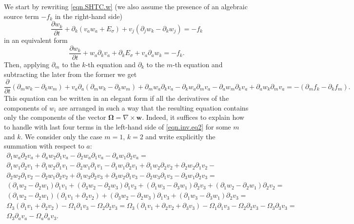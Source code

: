 \documentclass[twoside]{article}
\newcommand{\ww}{{\boldsymbol{w}}}
\newcommand{\ted}{E} %
\newcommand{\pd}{\partial}
\begin{document}
We start by rewriting \eqref{eqn.SHTC.w} (we also assume the presence of an 
algebraic source term $ -f_k $ in the right-hand side)
\begin{equation}\label{eqn.inv.eq1}
	\frac{\pd w_k}{\pd t} + \pd_k \left(v_a w_a 
	+ \ted_{\sigma}\right) + v_j(\pd_j w_k - \pd_k w_j) = -f_k
\end{equation}
in an equivalent form
\begin{equation*}
	\frac{\pd w_k}{\pd t} + w_a \pd_k v_a + \pd_k \ted_{\sigma} + v_a \pd_a w_k 
	= -f_k.
\end{equation*}
Then, applying $ \pd_m $ to the $ k $-th equation and $ \pd_k $ to the $ m $-th 
equation
and subtracting the later from the former we get
\begin{equation}\label{eqn.inv.eq2}
\frac{\pd }{\pd t}(\pd _mw_k-\pd _kw_m)+v_a\pd _a(\pd _mw_k-\pd _kw_m)+\pd 
_mw_a\pd
_kv_a-\pd _kw_a\pd _mv_a-\pd _aw_m\pd _kv_a+\pd _aw_k \pd _mv_a 
=-(\pd_m f_k - \pd_k f_m).
\end{equation}
This equation can be written in an elegant form if all the derivatives of the 
components of $ w_i $ are arranged in such a way that the resulting equation 
contains only the components of the vector $ \bm{\Omega} = \nabla\times\ww $. 
Indeed, it suffices to explain how to handle with last four terms in the 
left-hand side of 
\eqref{eqn.inv.eq2} for some  $ m $ and $ k $. We consider only the case $ m = 
1 $, $ k = 2 $ and 
write explicitly the summation with respect to $ a $:
\begin{gather}
\pd _1w_a\pd _2v_a+\pd _aw_2 \pd _1v_a-\pd _2w_a\pd _1v_a-\pd _aw_1\pd 
_2v_a=\nonumber\\
%
\pd _1w_1\pd _2v_1+\pd _1w_2 \pd _1v_1-\pd _2w_1\pd _1v_1-\pd _1w_1\pd 
_2v_1+\pd _1w_2\pd _2v_2+\pd _2w_2 \pd _1v_2-\nonumber\\
%
\pd _2w_2\pd _1v_2-\pd _2w_1\pd _2v_2+\pd _1w_3\pd _2v_3+\pd _3w_2 \pd 
_1v_3-\pd _2w_3\pd _1v_3-\pd_3w_1\pd _2v_3=\nonumber\\
%
\left(\pd _1w_2-\pd _2w_1\right)\pd _1v_1+\left(\pd _3w_2-\pd _2w_3\right)\pd 
_1v_3+\left(\pd _1w_3-\pd _3w_1\right)\pd _2v_3+\left(\pd _1w_2-\pd 
_2w_1\right)\pd _2v_2=\\
%
\left(\pd _1w_2-\pd _2w_1\right)\left(\pd _1v_1+\pd _2v_2\right)+\left(\pd 
_3w_2-\pd _2w_3\right)\pd _1v_3+\left(\pd_1w_3-\pd _3w_1\right)\pd 
_2v_3=\nonumber\\
%
\Omega _3\left(\pd _1v_1+\pd _2v_2\right)-\Omega _1\pd 
_1v_3-\Omega _2\pd _2v_3=\Omega _3\left(\pd _1v_1+\pd 
_2v_2+\pd
_3v_3\right)-\Omega _1\pd _1v_3-\Omega _2\pd _2v_3-\Omega _3\pd 
_3v_3=\nonumber\\
%
\Omega _3\pd _av_a-\Omega _a\pd _av_3\nonumber.
\end{gather}
\end{document}
